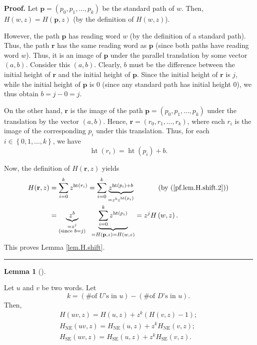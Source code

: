 \documentclass[numbers=enddot,12pt,final,onecolumn,notitlepage]{scrartcl}%
\theoremstyle{definition}
\newtheorem{lem}[theo]{Lemma}
\newenvironment{lemma}[1][]
{\begin{lem}[#1]\begin{leftbar}}
{\end{leftbar}\end{lem}}
\newenvironment{proof}[1][Proof]{\noindent\textbf{#1.} }{\ \rule{0.5em}{0.5em}}
\newcommand{\pp}{\mathbf{p}}
\newcommand{\rr}{\mathbf{r}}
\newcommand{\SE}{\operatorname{SE}}
\newcommand{\NE}{\operatorname{NE}}
\newcommand{\htt}{\operatorname{ht}}
\newcommand{\tup}[1]{\left( #1 \right)}
\newenvironment{verlong}{}{}
\begin{document}
\begin{verlong}
\begin{proof}
Let $\pp=\left(  p_{0},p_{1},\ldots,p_{k}\right)  $ be the standard path of $w$. Then, $H\left(  w,z\right)
=H\left(  \pp,z\right)  $ (by the definition of $H\left(  w,z\right)  $).

However, the path $\pp$ has reading word $w$ (by the definition of a standard path). Thus,
the path $\rr$ has the same reading word as $\pp$
(since both paths have reading word $w$). Thus, it is an image of $\pp$
under the parallel translation by some vector $\left(  a,b\right)  $. Consider
this $\left(  a,b\right)  $. Clearly, $b$ must be the difference between the
initial height of $\rr$ and the initial height of $\pp$. Since
the initial height of $\rr$ is $j$, while the initial height of
$\pp$ is $0$ (since any standard path has initial height $0$), we thus obtain $b=j-0=j$.

On the other hand, $\rr$ is the image of the path $\pp=\left(
p_{0},p_{1},\ldots,p_{k}\right)  $ under the translation by the vector
$\left(  a,b\right)  $. Hence, $\rr=\left(  r_{0},r_{1},\ldots
,r_{k}\right)  $, where each $r_{i}$ is the image of the corresponding $p_{i}$
under this translation. Thus, for each $i\in\left\{  0,1,\ldots,k\right\}  $,
we have
\begin{equation}
\htt\left(  r_{i}\right)  =\htt\left(
p_{i}\right)  +b.
\label{pf.lem.H.shift.2}
\end{equation}


Now, the definition of $H\left(  \rr,z\right)  $ yields%
\begin{align*}
H(\rr,z)  & =\sum_{i=0}^{k}z^{\htt\left(  r_{i}\right)
}=\sum_{i=0}^{k}\underbrace{z^{\htt\left(  p_{i}\right)  +b}%
}_{=z^{b}z^{\htt\left(  p_{i}\right)  }}%
\ \ \ \ \ \ \ \ \ \ \left(  \text{by (\ref{pf.lem.H.shift.2})}\right)  \\
& =\underbrace{z^{b}}_{\substack{=z^{j}\\\text{(since }b=j\text{)}%
}}\ \ \underbrace{\sum_{i=0}^{k}z^{\htt\left(  p_{i}\right)  }%
}_{=H\left(  \pp,z\right)  =H\left(  w,z\right)  }=z^{j}H\left(
w,z\right)  .
\end{align*}
This proves Lemma \ref{lem.H.shift}.
\end{proof}
\end{verlong}

\begin{lemma} \label{lem.H.prod}
Let $u$ and $v$ be two words. Let
\[
k = \tup{\text{\# of $U$'s in $u$}} - \tup{\text{\# of $D$'s in $u$}}.
\]
Then,
\begin{align}
    H\tup{uv, z} = H\tup{u,z} + z^k \tup{H\tup{v,z}-1}; \label{eq.lem.H.prod.H} \\
    H_{\NE}\tup{uv, z} = H_{\NE}\tup{u,z} + z^k H_{\NE}\tup{v,z}; \label{eq.lem.H.prod.HNE} \\
    H_{\SE}\tup{uv, z} = H_{\SE}\tup{u,z} + z^k H_{\SE}\tup{v,z}.
    \label{eq.lem.H.prod.HSE}
\end{align}
\end{lemma}
\end{document}
